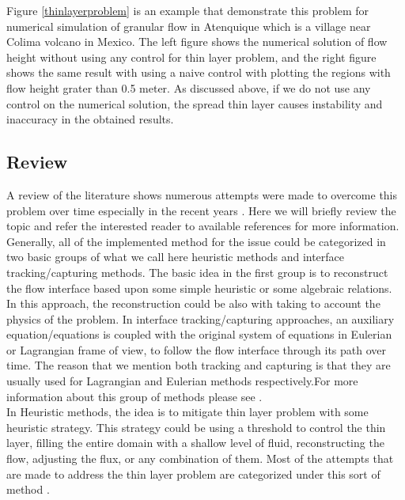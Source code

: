\documentclass[letterpaper,10pt]{article}
\begin{document}
Figure \ref{thinlayerproblem} is an example that demonstrate this problem for numerical simulation of granular flow in  Atenquique which is a village near Colima volcano in Mexico. The left figure shows the numerical solution of flow height without using any control for thin layer problem, and the right figure shows the same result with using a naive control with plotting the regions with flow height grater than 0.5 meter. As discussed above, if we do not use any control on the numerical solution, the spread thin layer causes instability and inaccuracy in the obtained results.

\subsection{Review}
A review of the literature shows numerous attempts were made to overcome this problem over time especially in the recent years \cite{Medeiros2013,Balzano1998,Aureli2008,Bunya2009,Casulli2009a,
Kesserwani2011,DAlpaos2007,Castro2005a}.
Here we will briefly review the topic and refer the interested reader to available references for more information. \newline
Generally, all of the implemented method for the issue could be 
categorized in two basic groups of what we call here heuristic methods and interface tracking/capturing methods.
The basic idea in the first group is to reconstruct the flow interface based upon 
some simple heuristic or some algebraic relations. In this approach, the reconstruction could be also with taking to account the physics of the problem. In interface tracking/capturing approaches, an auxiliary equation/equations is coupled with the original system of equations in Eulerian or Lagrangian frame of view, to follow the flow interface through its path over time. 
The reason that we mention both tracking and capturing is that they are usually used for Lagrangian and Eulerian methods respectively.For more information about this group of methods please see \cite{Glimm1995,Unverdi1992,Osher1988,Anderson1998,hirt1981vfv}.\\


In Heuristic methods, the idea is to mitigate thin layer problem with some heuristic strategy. This strategy could be using a threshold to control the thin layer, filling the entire domain with a shallow level of fluid, reconstructing the flow, adjusting the flux, or any combination of them. Most of the attempts that are made to address the thin layer problem are categorized under this sort of method \cite{Aureli2008,Bunya2009,Castro2005a,Kesserwani2011}.
\end{document}
